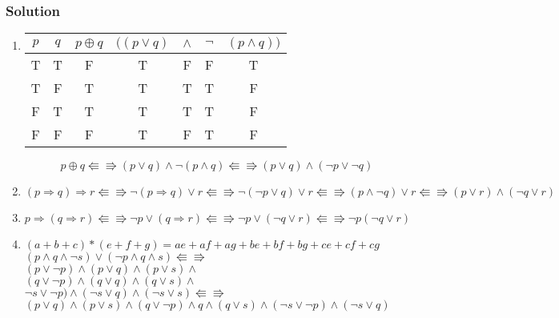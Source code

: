 \subsubsection*{Solution}
\begin{enumerate}
	\item \hspace{1em}
	\begin{center}
		\begin{tabular}{cc|c|cccc}
		$p$ & $q$ & $p \oplus q$ & $((p\lor q)$ &$\land$&$\neg$&$(p \land q))$\\
		\hline
		T&T&F&T&F&F&T\\
		T&F&T&T&T&T&F\\
		F&T&T&T&T&T&F\\
		F&F&F&T&F&T&F\\
		\end{tabular}
	\end{center}
$$p \oplus q  \Lleftarrow\!\!\!\!\Rrightarrow (p\lor q)\land\neg (p \land q) \Lleftarrow\!\!\!\!\Rrightarrow (p\lor q)\land (\neg p\lor \neg q)$$

	\item \hspace{1em}

$$ (p \Rightarrow q) \Rightarrow r \Lleftarrow\!\!\!\!\Rrightarrow \neg(p \Rightarrow q) \lor r \Lleftarrow\!\!\!\!\Rrightarrow \neg (\neg p \lor q ) \lor r \Lleftarrow\!\!\!\!\Rrightarrow (p \land \neg q) \lor r \Lleftarrow\!\!\!\!\Rrightarrow (p \lor r) \land (\neg q \lor r)$$
	\item \hspace{1em}

$$ p \Rightarrow (q \Rightarrow r) \Lleftarrow\!\!\!\!\Rrightarrow \neg p \lor (q \Rightarrow r) \Lleftarrow\!\!\!\!\Rrightarrow \neg p \lor (\neg q \lor r) \Lleftarrow\!\!\!\!\Rrightarrow \neg p (\neg q \lor r) $$
	\item \hspace{1em}

\begin{flushright}
$(a + b + c) * (e + f + g) = ae + af + ag + be + bf + bg + ce + cf + cg$\\
$(p \land q \land \neg s)\lor (\neg p \land q \land s) \Lleftarrow\!\!\!\!\Rrightarrow$\\
$(p \lor \neg p) \land (p \lor q) \land (p \lor s) \land$\\
$(q \lor \neg p) \land (q \lor q) \land (q \lor s) \land$\\
$\neg s \lor \neg p) \land (\neg s \lor q) \land (\neg s \lor s) \Lleftarrow\!\!\!\!\Rrightarrow$\\
$(p\lor q) \land ( p\lor s) \land (q\lor \neg p)\land q \land (q\lor s)\land (\neg s\lor \neg p ) \land (\neg s \lor q)$\\


\end{flushright}
\end{enumerate}
